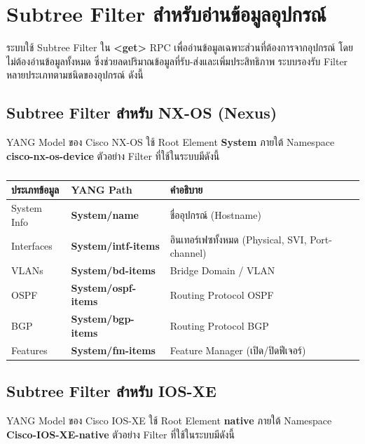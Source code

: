 \section{Subtree Filter สำหรับอ่านข้อมูลอุปกรณ์}
\hspace*{1.3em}
ระบบใช้ Subtree Filter ใน \textbf{<get>} RPC เพื่ออ่านข้อมูลเฉพาะส่วนที่ต้องการจากอุปกรณ์ โดยไม่ต้องอ่านข้อมูลทั้งหมด ซึ่งช่วยลดปริมาณข้อมูลที่รับ-ส่งและเพิ่มประสิทธิภาพ ระบบรองรับ Filter หลายประเภทตามชนิดของอุปกรณ์ ดังนี้

\subsection{Subtree Filter สำหรับ NX-OS (Nexus)}
\hspace*{1.3em}
YANG Model ของ Cisco NX-OS ใช้ Root Element \textbf{System} ภายใต้ Namespace \textbf{cisco-nx-os-device} ตัวอย่าง Filter ที่ใช้ในระบบมีดังนี้

\begin{table}[H]
\centering
\caption{}
\label{tabD:NxosFilters}
\begin{tabularx}{\textwidth}{|l|l|X|}
\hline
\textbf{ประเภทข้อมูล} & \textbf{YANG Path} & \textbf{คำอธิบาย} \\
\hline
System Info & \textbf{System/name} & ชื่ออุปกรณ์ (Hostname) \\
\hline
Interfaces & \textbf{System/intf-items} & อินเทอร์เฟซทั้งหมด (Physical, SVI, Port-channel) \\
\hline
VLANs & \textbf{System/bd-items} & Bridge Domain / VLAN \\
\hline
OSPF & \textbf{System/ospf-items} & Routing Protocol OSPF \\
\hline
BGP & \textbf{System/bgp-items} & Routing Protocol BGP \\
\hline
Features & \textbf{System/fm-items} & Feature Manager (เปิด/ปิดฟีเจอร์) \\
\hline
\end{tabularx}
\end{table}

\subsection{Subtree Filter สำหรับ IOS-XE}
\hspace*{1.3em}
YANG Model ของ Cisco IOS-XE ใช้ Root Element \textbf{native} ภายใต้ Namespace \textbf{Cisco-IOS-XE-native} ตัวอย่าง Filter ที่ใช้ในระบบมีดังนี้

